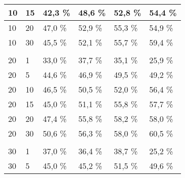 \begin{table}[!htb]
\begin{tabular}{llllll}
\multicolumn{1}{|l|}{10}  & \multicolumn{1}{l|}{15}  & \multicolumn{1}{l|}{42,3 \%} & \multicolumn{1}{l|}{48,6 \%} & \multicolumn{1}{l|}{52,8 \%} & \multicolumn{1}{l|}{54,4 \%} \\ \hline
\multicolumn{1}{|l|}{10}  & \multicolumn{1}{l|}{20}  & \multicolumn{1}{l|}{47,0 \%} & \multicolumn{1}{l|}{52,9 \%} & \multicolumn{1}{l|}{55,3 \%} & \multicolumn{1}{l|}{54,9 \%} \\ \hline
\multicolumn{1}{|l|}{10}  & \multicolumn{1}{l|}{30}  & \multicolumn{1}{l|}{45,5 \%} & \multicolumn{1}{l|}{52,1 \%} & \multicolumn{1}{l|}{55,7 \%} & \multicolumn{1}{l|}{59,4 \%} \\ \hline
 &  & & & & \\ \hline
\multicolumn{1}{|l|}{20}  & \multicolumn{1}{l|}{1} & \multicolumn{1}{l|}{33,0 \%} & \multicolumn{1}{l|}{37,7 \%} & \multicolumn{1}{l|}{35,1 \%} & \multicolumn{1}{l|}{25,9 \%} \\ \hline
\multicolumn{1}{|l|}{20}  & \multicolumn{1}{l|}{5} & \multicolumn{1}{l|}{44,6 \%} & \multicolumn{1}{l|}{46,9 \%} & \multicolumn{1}{l|}{49,5 \%} & \multicolumn{1}{l|}{49,2 \%} \\ \hline
\multicolumn{1}{|l|}{20}  & \multicolumn{1}{l|}{10}  & \multicolumn{1}{l|}{46,5 \%} & \multicolumn{1}{l|}{50,5 \%} & \multicolumn{1}{l|}{52,0 \%} & \multicolumn{1}{l|}{56,4 \%} \\ \hline
\multicolumn{1}{|l|}{20}  & \multicolumn{1}{l|}{15}  & \multicolumn{1}{l|}{45,0 \%} & \multicolumn{1}{l|}{51,1 \%} & \multicolumn{1}{l|}{55,8 \%} & \multicolumn{1}{l|}{57,7 \%} \\ \hline
\multicolumn{1}{|l|}{20}  & \multicolumn{1}{l|}{20}  & \multicolumn{1}{l|}{47,4 \%} & \multicolumn{1}{l|}{55,8 \%} & \multicolumn{1}{l|}{58,2 \%} & \multicolumn{1}{l|}{58,0 \%} \\ \hline
\multicolumn{1}{|l|}{20}  & \multicolumn{1}{l|}{30}  & \multicolumn{1}{l|}{50,6 \%} & \multicolumn{1}{l|}{56,3 \%} & \multicolumn{1}{l|}{58,0 \%} & \multicolumn{1}{l|}{60,5 \%} \\ \hline
 &  & & & & \\ \hline
\multicolumn{1}{|l|}{30}  & \multicolumn{1}{l|}{1} & \multicolumn{1}{l|}{37,0 \%} & \multicolumn{1}{l|}{36,4 \%} & \multicolumn{1}{l|}{38,7 \%} & \multicolumn{1}{l|}{25,2 \%} \\ \hline
\multicolumn{1}{|l|}{30}  & \multicolumn{1}{l|}{5} & \multicolumn{1}{l|}{45,0 \%} & \multicolumn{1}{l|}{45,2 \%} & \multicolumn{1}{l|}{51,5 \%} & \multicolumn{1}{l|}{49,6 \%} \\ \hline

\end{tabular}
\end{table}
